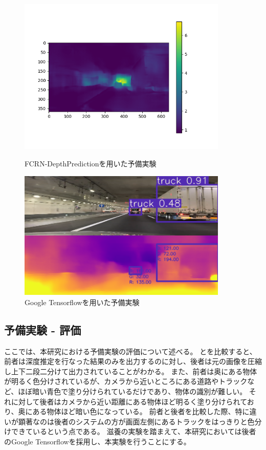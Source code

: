 \begin{figure}[htbp]
   \begin{center}
    \includegraphics[width=10cm]{figs/preex1.png}
   \end{center}
   \caption{FCRN-DepthPredictionを用いた予備実験}
   \label{fig:preex1}

  \begin{center}
   \includegraphics[width=10cm]{figs/preex2.png}
  \end{center}
   \caption{Google Tensorflowを用いた予備実験}
   \label{fig:preex2}
 \end{figure}

\subsection{予備実験 - 評価}
ここでは、本研究における予備実験の評価について述べる。
とを比較すると、前者は深度推定を行なった結果のみを出力するのに対し、後者は元の画像を圧縮し上下二段二分けて出力されていることがわかる。
また、前者は奥にある物体が明るく色分けされているが、カメラから近いところにある道路やトラックなど、ほぼ暗い青色で塗り分けられているだけであり、物体の識別が難しい。
それに対して後者はカメラから近い距離にある物体ほど明るく塗り分けられており、奥にある物体ほど暗い色になっている。
前者と後者を比較した際、特に違いが顕著なのは後者のシステムの方が画面左側にあるトラックをはっきりと色分けできているという点である。
滋養の実験を踏まえて、本研究においては後者のGoogle Tensorflowを採用し、本実験を行うことにする。

